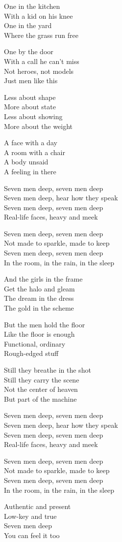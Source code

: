 \begin{lyrics}
One in the kitchen\\
With a kid on his knee\\
One in the yard\\
Where the grass run free

One by the door\\
With a call he can’t miss\\
Not heroes, not models\\
Just men like this

Less about shape\\
More about state\\
Less about showing\\
More about the weight

A face with a day\\
A room with a chair\\
A body unsaid\\
A feeling in there

Seven men deep, seven men deep\\
Seven men deep, hear how they speak\\
Seven men deep, seven men deep\\
Real-life faces, heavy and meek

Seven men deep, seven men deep\\
Not made to sparkle, made to keep\\
Seven men deep, seven men deep\\
In the room, in the rain, in the sleep

And the girls in the frame\\
Get the halo and gleam\\
The dream in the dress\\
The gold in the scheme

But the men hold the floor\\
Like the floor is enough\\
Functional, ordinary\\
Rough-edged stuff

Still they breathe in the shot\\
Still they carry the scene\\
Not the center of heaven\\
But part of the machine

Seven men deep, seven men deep\\
Seven men deep, hear how they speak\\
Seven men deep, seven men deep\\
Real-life faces, heavy and meek

Seven men deep, seven men deep\\
Not made to sparkle, made to keep\\
Seven men deep, seven men deep\\
In the room, in the rain, in the sleep

Authentic and present\\
Low-key and true\\
Seven men deep\\
You can feel it too
\end{lyrics}


